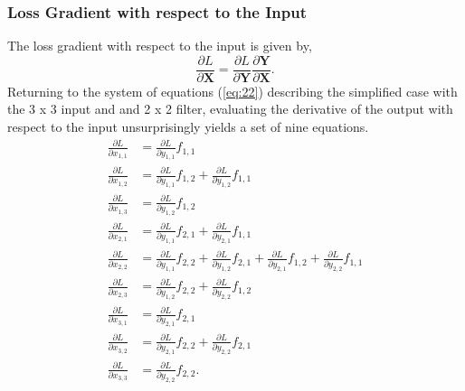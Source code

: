 \documentclass[twocolumn,pra,floatfix]{revtex4-2}
\begin{document}
            \subsubsection{Loss Gradient with respect to the Input}

                The loss gradient with respect to the input is given by,
                \begin{equation}
                    \frac{\partial L}{\partial \mathbf{X}} = \frac{\partial L}{\partial \mathbf{Y}} \frac{\partial \mathbf{Y}}{\partial \mathbf{X}}\label{eq: loss (conv) wrt input}.
                \end{equation}
                Returning to the system of equations (\ref{eq:22}) describing the simplified case with the 3 x 3 input and and 2 x 2 filter, evaluating the derivative of the output with respect to the input unsurprisingly yields a set of nine equations.
                \begin{equation}
                    \begin{aligned}
                        \frac{\partial L}{\partial x_{1,1}} &= \frac{\partial L}{\partial y_{1,1}}f_{1,1}\\ 
                        \frac{\partial L}{\partial x_{1,2}} &= \frac{\partial L}{\partial y_{1,1}}f_{1,2} + \frac{\partial L}{\partial y_{1,2}}f_{1,1}\\
                        \frac{\partial L}{\partial x_{1,3}} &= \frac{\partial L}{\partial y_{1,2}}f_{1,2}\\
                        \frac{\partial L}{\partial x_{2,1}} &= \frac{\partial L}{\partial y_{1,1}}f_{2,1} + \frac{\partial L}{\partial y_{2,1}}f_{1,1}\\
                        \frac{\partial L}{\partial x_{2,2}} &= \frac{\partial L}{\partial y_{1,1}}f_{2,2} + \frac{\partial L}{\partial y_{1,2}}f_{2,1} + \frac{\partial L}{\partial y_{2,1}}f_{1,2} + \frac{\partial L}{\partial y_{2,2}}f_{1,1}\\
                        \frac{\partial L}{\partial x_{2,3}} &= \frac{\partial L}{\partial y_{1,2}}f_{2,2} + \frac{\partial L}{\partial y_{2,2}}f_{1,2} \\
                        \frac{\partial L}{\partial x_{3,1}} &= \frac{\partial L}{\partial y_{2,1}}f_{2,1} \\
                        \frac{\partial L}{\partial x_{3,2}} &= \frac{\partial L}{\partial y_{2,1}}f_{2,2} + \frac{\partial L}{\partial y_{2,2}}f_{2,1}\\
                        \frac{\partial L}{\partial x_{3,3}} &= \frac{\partial L}{\partial y_{2,2}}f_{2,2}.
                    \end{aligned}\label{eq:32}
                \end{equation}
\end{document}
